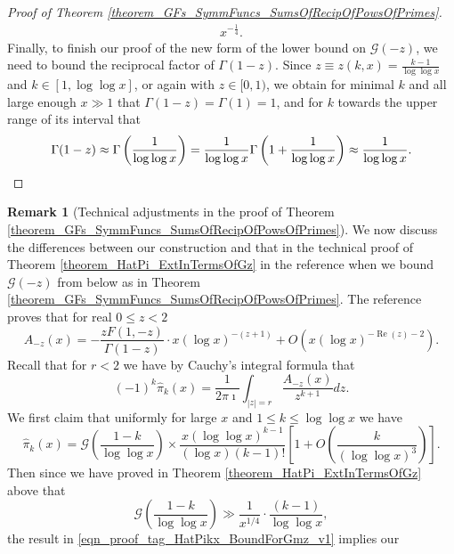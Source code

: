 \documentclass[11pt,reqno,a4letter]{article}
\numberwithin{figure}{section}
\numberwithin{table}{section}
\theoremstyle{plain}
\numberwithin{theorem}{section}
\theoremstyle{definition}
\newtheorem{remark}[theorem]{Remark}
\renewcommand{\Re}{\operatorname{Re}}
\begin{document}
\begin{proof}[Proof of Theorem \ref{theorem_GFs_SymmFuncs_SumsOfRecipOfPowsOfPrimes}]
\begin{align}
     x^{-\frac{1}{4}}. 
\end{align} 
Finally, to finish our proof of the new form of the lower bound on $\mathcal{G}(-z)$, 
we need to bound the reciprocal factor of $\Gamma(1-z)$. 
Since $z \equiv z(k, x) = \frac{k-1}{\log\log x}$ and 
$k \in [1, \log\log x]$, or again with $z \in [0, 1)$, 
we obtain for minimal $k$ and all large enough $x \gg 1$ that 
$\Gamma(1-z) = \Gamma(1) = 1$, and for $k$ towards the upper range of 
its interval that 
\[
\Gamma(1-z) \approx \Gamma\left(\frac{1}{\log\log x}\right) = 
     \frac{1}{\log\log x} \Gamma\left(1 + \frac{1}{\log\log x}\right) 
     \approx \frac{1}{\log\log x}. 
     \qedhere 
\]
\end{proof} 

\begin{remark}[Technical adjustments in the proof of Theorem \ref{theorem_GFs_SymmFuncs_SumsOfRecipOfPowsOfPrimes}] 
\label{remark_TechAdjustments_theorem_HatPi_ExtInTermsOfGz_TO_GFs_SymmFuncs_SumsOfRecipOfPowsOfPrimes} 
We now discuss the differences between our construction and that in 
the technical proof of Theorem \ref{theorem_HatPi_ExtInTermsOfGz} 
in the reference when we bound $\mathcal{G}(-z)$ from below as in 
Theorem \ref{theorem_GFs_SymmFuncs_SumsOfRecipOfPowsOfPrimes}. 
The reference proves that for real $0 \leq z < 2$ 
\begin{equation} 
\label{eqn_MV_Azx_formula} 
A_{-z}(x) = -\frac{z F(1, -z)}{\Gamma(1-z)} \cdot x (\log x)^{-(z+1)} + 
     O\left(x (\log x)^{-\Re(z) - 2}\right). 
\end{equation}
Recall that for $r < 2$ we have by Cauchy's integral formula that 
\begin{equation} 
\label{eqn_MV7.61_CIF} 
(-1)^{k} \widehat{\pi}_k(x) = \frac{1}{2\pi\imath} \int_{|z|=r} 
     \frac{A_{-z}(x)}{z^{k+1}} dz. 
\end{equation} 
We first claim that uniformly for large $x$ and $1 \leq k \leq \log\log x$ we have 
\begin{equation} 
\label{eqn_proof_tag_HatPikx_BoundForGmz_v1} 
\widehat{\pi}_k(x) = \mathcal{G}\left(\frac{1-k}{\log\log x}\right) \times 
     \frac{x (\log\log x)^{k-1}}{(\log x) (k-1)!} 
     \left[1 + O\left(\frac{k}{(\log\log x)^3}\right)\right]. 
\end{equation} 
Then since we have proved in Theorem \ref{theorem_HatPi_ExtInTermsOfGz} 
above that 
\[
\mathcal{G}\left(\frac{1-k}{\log\log x}\right) \gg 
     \frac{1}{x^{1/4}} \cdot 
     \frac{(k-1)}{\log\log x}, 
\]
the result in \eqref{eqn_proof_tag_HatPikx_BoundForGmz_v1} implies our 

\end{remark}
\end{document}
